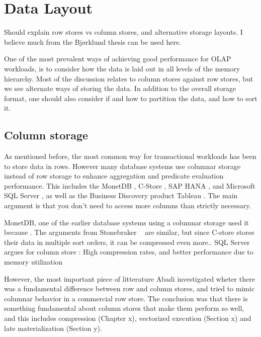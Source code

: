 \chapter{Data Layout}
\label{chap:Data Layout}
\begin{secex}
  Should explain row stores vs column stores, and alternative storage layouts. I believe much from the Bjørklund thesis can be used here.
\end{secex}
One of the most prevalent ways of achieving good performance for OLAP workloads, is to consider how the data is laid out in all levels of the memory hierarchy. Most of the discussion relates to column stores against row stores, but we see alternate ways of storing the data. In addition to the overall storage format, one should also consider if and how to partition the data, and how to sort it.
\newpage

\section{Column storage}
\label{sec:Column storage}
As mentioned before, the most common way for transactional workloads has been to store data in rows. However many database systems use columnar storage instead of row storage to enhance aggregation and predicate evaluation performance. This includes the MonetDB \cite{Boncz2002-yj, Boncz2005-yj}, C-Store \cite{Stonebraker2015-qz}, SAP HANA \cite{Farber2012-vh}, and Microsoft SQL Server \cite{Larson2013-mc, noauthor_undated-vq}, as well as the Business Discovery product Tableau \cite{Kamkolkar2015-iq}. The main argument is that you don't need to access more columns than strictly necessary.

MonetDB, one of the earlier database systems using a columnar storage used it because  \cite{Boncz2002-yj}. The arguments from Stonebraker \ea~\cite{Stonebraker2005-qz} are similar, but since C-store stores their data in multiple sort orders, it can be compressed even more.. SQL Server argues for column store \cite{noauthor_undated-vq}: High compression rates, and better performance due to memory utilization

However, the most important piece of litterature Abadi \ea \cite{Abadi2008-dd} investigated wheter there was a fundamental difference between row and column stores, and tried to mimic columnar behavior in a commercial row store. The conclusion was that there is something fundamental about column stores that make them perform so well, and this includes compression (Chapter x), vectorized execution (Section x) and late materialization (Section y). 

